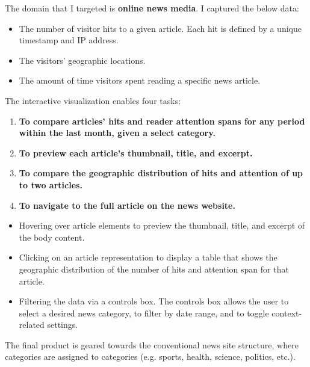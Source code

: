 \documentclass[12pt]{article}
\begin{document}
The domain that I targeted is \textbf{online news media}. I captured the below data:
\begin{itemize}
\item The number of visitor hits to a given article. Each hit is defined by a unique timestamp and IP address.
\item The visitors' geographic locations.
\item The amount of time visitors spent reading a specific news article.
\end{itemize}

\newpage

\noindent The interactive visualization enables four tasks:
\begin{enumerate}
\item \textbf{To compare articles' hits and reader attention spans for any period within the last month, given a select category.}
\item \textbf{To preview each article's thumbnail, title, and excerpt.}
\item \textbf{To compare the geographic distribution of hits and attention of up to two articles.}
\item \textbf{To navigate to the full article on the news website.}
\end{enumerate}

\begin{itemize}
\item Hovering over article elements to preview the thumbnail, title, and excerpt of the body content.
\item Clicking on an article representation to display a table that shows the geographic distribution of the number of hits and attention span for that article.
\item Filtering the data via a controls box. The controls box allows the user to select a desired news category, to filter by date range, and to toggle context-related settings. 
\end{itemize}

\noindent The final product is geared towards the conventional news site structure, where categories are assigned to categories (e.g. sports, health, science, politics, etc.). \\
\end{document}

